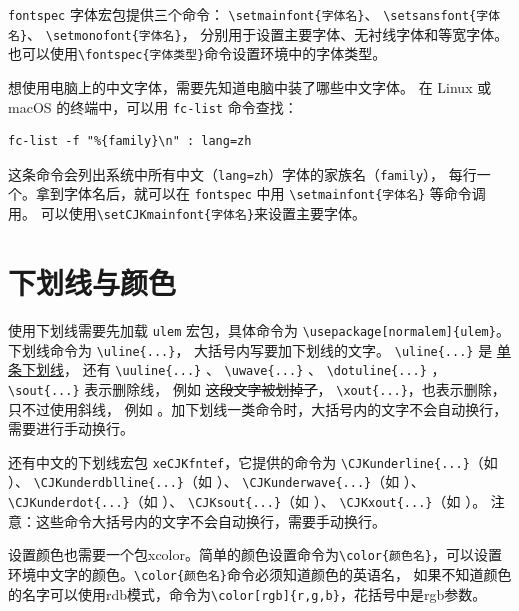 \documentclass[12pt,a4paper]{ctexart}
\begin{document}
\texttt{fontspec} 字体宏包提供三个命令：
\texttt{\textbackslash setmainfont\{字体名\}}、
\texttt{\textbackslash setsansfont\{字体名\}}、
\texttt{\textbackslash setmonofont\{字体名\}}，
分别用于设置主要字体、无衬线字体和等宽字体。
也可以使用\texttt{\textbackslash fontspec\{字体类型\}}命令设置环境中的字体类型。

想使用电脑上的中文字体，需要先知道电脑中装了哪些中文字体。
在 Linux 或 macOS 的终端中，可以用 \texttt{fc-list} 命令查找：

\begin{verbatim}
fc-list -f "%{family}\n" : lang=zh
\end{verbatim}

这条命令会列出系统中所有中文（\texttt{lang=zh}）字体的家族名（\texttt{family}），
每行一个。拿到字体名后，就可以在 \texttt{fontspec} 中用
\texttt{\textbackslash setmainfont\{字体名\}} 等命令调用。
可以使用\texttt{\textbackslash setCJKmainfont\{字体名\}}来设置主要字体。

\section{下划线与颜色}
使用下划线需要先加载 \texttt{ulem} 宏包，具体命令为
\texttt{\textbackslash usepackage[normalem]\{ulem\}}。
下划线命令为 \texttt{\textbackslash uline\{...\}}，
大括号内写要加下划线的文字。
\texttt{\textbackslash uline\{...\}} 是 \uline{单条下划线}，
还有 \texttt{\textbackslash uuline\{...\}} 、
\texttt{\textbackslash uwave\{...\}} 、
\texttt{\textbackslash dotuline\{...\}} ，
\texttt{\textbackslash sout\{...\}} 表示删除线，
例如 \sout{这段文字被划掉了}，
\texttt{\textbackslash xout\{...\}}，也表示删除，只不过使用斜线，
例如 。加下划线一类命令时，大括号内的文字不会自动换行，
需要进行手动换行。

还有中文的下划线宏包 \texttt{xeCJKfntef}，它提供的命令为
\verb|\CJKunderline{...}|（如 ）、
\verb|\CJKunderdblline{...}|（如 ）、
\verb|\CJKunderwave{...}|（如 ）、
\verb|\CJKunderdot{...}|（如 ）、
\verb|\CJKsout{...}|（如 ）、
\verb|\CJKxout{...}|（如 ）。
注意：这些命令大括号内的文字不会自动换行，需要手动换行。

\vspace*{\baselineskip}

设置颜色也需要一个包xcolor。简单的颜色设置命令为\verb|\color{颜色名}|，可以设置环境中文字的颜色。\verb|\color{颜色名}|命令必须知道颜色的英语名，
如果不知道颜色的名字可以使用rdb模式，命令为\verb|\color[rgb]{r,g,b}|，花括号中是rgb参数。
\end{document}
